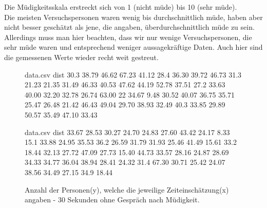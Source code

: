 \documentclass{Paper}
\begin{document}
Die Müdigkeitsskala erstreckt sich von 1 (nicht müde) bis 10 (sehr müde).\\
Die meisten Versuchspersonen waren wenig bis durchschnittlich müde, haben aber nicht besser geschätzt als jene, die angaben, überdurchschnittlich müde zu sein. Allerdings muss man hier beachten, dass wir nur wenige Versuchspersonen, die sehr müde waren und entsprechend weniger aussagekräftige Daten.
Auch hier sind die gemessenen Werte wieder recht weit gestreut.
\linebreak
\linebreak
\begin{figure}[H]
\begin{filecontents}{data.csv}
dist
   30.3 
   38.79 
 46.62 
 67.23 
 41.12 
 28.4 
 36.30 
 39.72 
 46.73 
 31.3 
 21.23 
 21.35 
 31.49 
 46.33 
 40.53 
 47.62 
 44.19 
 52.78 
 37.51 
 27.2 
 33.63 
 40.00 
 32.20 
 32.78 
 26.74 
 63.00 
 22 
 34.67 
 9.48 
 30.52 
 40.07 
 36.75 
 35.71 
 25.47 
 26.48 
 21.42 
 46.43 
 49.04 
 29.70 
 38.93 
 32.49 
 40.3 
 33.85 
 29.89 
 50.57 
 35.49 
 47.10 
 33.43 
\end{filecontents}
\begin{minipage}[t]{0.49\linewidth}
\caption{Anzahl der Personen(y), welche die jeweilige Zeiteinschätzung(x) angaben - 40 Sekunden ohne Gespräch nach Müdigkeit.}
\label{HistZeit40sekMued}
\end{minipage}
\hfill
\begin{filecontents}{data.csv}
dist
  33.67 
 28.53 
 30.27 
 24.70 
 24.83 
 27.60 
 43.42 
 24.17 
 8.33 
 15.1 
 33.88 
 24.95 
 35.53 
 36.2 
 26.59 
 31.79
 31.93 
 25.46 
 41.49 
 15.61 
 33.2
 18.44 
 32.13 
 27.72 
 47.09 
 27.73 
 15.40 
 44.73 
 33.57 
 28.16  
 24.87 
 28.69 
 34.33 
 34.77 
 36.04 
 38.94 
 28.41 
 24.32 
 31.4 
 67.30 
 30.71 
 25.42 
 24.07 
 38.56 
 34.49 
 27.15  
 34.9 
18.44 
\end{filecontents}
\begin{minipage}[t]{0.49\linewidth}
\caption{Anzahl der Personen(y), welche die jeweilige Zeiteinschätzung(x) angaben - 30 Sekunden ohne Gespräch nach Müdigkeit.}
\label{HistZeit30sekMued}
\end{minipage}
\end{figure}
\end{document}
